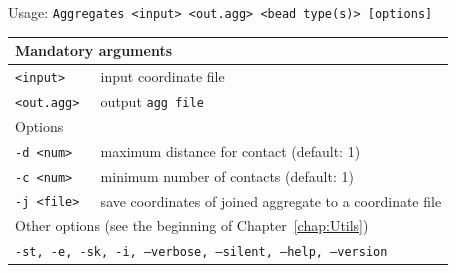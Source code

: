 \vspace{1em}
\noindent
Usage: \tt{Aggregates <input> <out.agg> <bead type(s)> [options]}
\noindent
\begin{longtable}{p{}p{}}
  \toprule
  \multicolumn{2}{l}{Mandatory arguments}\\
  \midrule
  \tt{<input>}        & input coordinate file\\
  \tt{<out.agg>}      & output \tt{agg} file\\
  \midrule
  \multicolumn{2}{l}{Options}\\
  \midrule
  \tt{-d <num>}       & maximum distance for contact (default: 1)\\
  \tt{-c <num>}       & minimum number of contacts (default: 1)\\
  \tt{-j <file>}      & save coordinates of joined aggregate to
                        a coordinate file\\
  \midrule
  \multicolumn{2}{l}{Other options (see the beginning of 
                     Chapter~\ref{chap:Utils})}\\
  \midrule
  \multicolumn{2}{l}{\tt{-st},
                     \tt{-e},
                     \tt{-sk},
                     \tt{-i},
                     \tt{--verbose},
                     \tt{--silent},
                     \tt{--help},
                     \tt{--version}}\\
  \bottomrule
\end{longtable}
